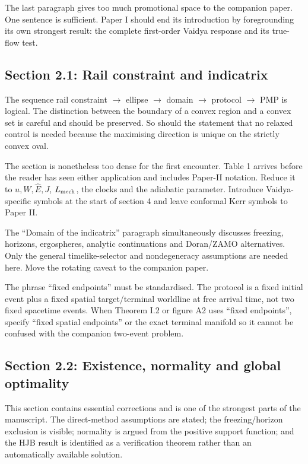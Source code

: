 \documentclass[11pt,a4paper]{article}
\begin{document}
The last paragraph gives too much promotional space to the companion paper.  One sentence is
sufficient.  Paper I should end its introduction by foregrounding its own strongest result: the
complete first-order Vaidya response and its true-flow test.

\subsection{Section 2.1: Rail constraint and indicatrix}

The sequence rail constraint $\rightarrow$ ellipse $\rightarrow$ domain $\rightarrow$ protocol
$\rightarrow$ PMP is logical.  The distinction between the boundary of a convex region and a
convex set is careful and should be preserved.  So should the statement that no relaxed control is
needed because the maximising direction is unique on the strictly convex oval.

The section is nonetheless too dense for the first encounter.  Table 1 arrives before the reader
has seen either application and includes Paper-II notation.  Reduce it to $u,W,\hat E,J$,
$L_{\rm mech}$, the clocks and the adiabatic parameter.  Introduce Vaidya-specific symbols at the
start of section 4 and leave conformal Kerr symbols to Paper II.

The ``Domain of the indicatrix'' paragraph simultaneously discusses freezing, horizons,
ergospheres, analytic continuations and Doran/ZAMO alternatives.  Only the general timelike-selector
and nondegeneracy assumptions are needed here.  Move the rotating caveat to the companion paper.

The phrase ``fixed endpoints'' must be standardised.  The protocol is a fixed initial event plus a
fixed spatial target/terminal worldline at free arrival time, not two fixed spacetime events.  When
Theorem I.2 or figure A2 uses ``fixed endpoints'', specify ``fixed spatial endpoints'' or the exact
terminal manifold so it cannot be confused with the companion two-event problem.

\subsection{Section 2.2: Existence, normality and global optimality}

This section contains essential corrections and is one of the strongest parts of the manuscript.
The direct-method assumptions are stated; the freezing/horizon exclusion is visible; normality is
argued from the positive support function; and the HJB result is identified as a verification
theorem rather than an automatically available solution.
\end{document}
